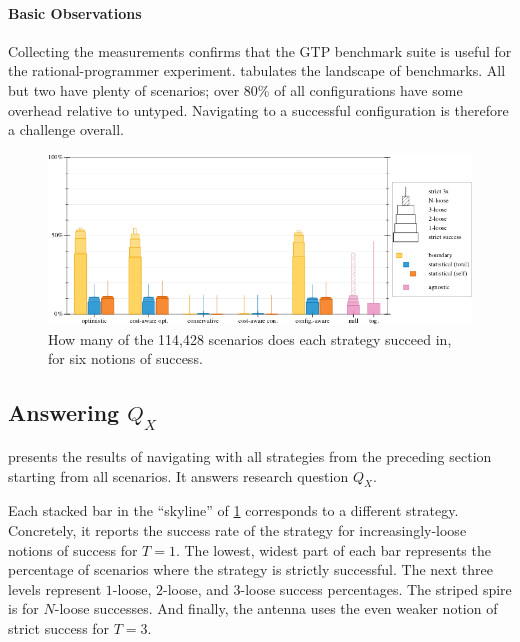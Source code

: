 \paragraph{Basic Observations}

Collecting the measurements confirms that the GTP benchmark suite is useful for
the rational-programmer experiment.  tabulates the
landscape of benchmarks.  All but two have plenty of scenarios; over 80\% of all
configurations have some overhead relative to untyped.  Navigating to a
successful configuration is therefore a challenge overall.

\begin{figure}[ht]
  \includegraphics[width=\columnwidth]{data/strategy-overall-feasible.pdf}
  \caption{How many of the 114,428 scenarios does each strategy succeed in, for six notions of success.}
  \label{f:strategy-overall}
\end{figure}

\subsection{Answering $Q_X$} \label{subsec:qx}

 presents the results of navigating with all strategies
from the preceding section starting from all scenarios. It answers
research question $Q_X$. 

Each stacked bar in the ``skyline'' of \cref{f:strategy-overall} corresponds to
a different strategy. Concretely, it reports the success
rate of the strategy for increasingly-loose notions of success for $T = 1$.  The
lowest, widest part of each bar represents the percentage of scenarios where the
strategy is strictly successful. The next three levels represent $1$-loose,
$2$-loose, and $3$-loose success percentages.  The striped spire is for
$N$-loose successes.  And finally, the antenna uses the even weaker notion of
strict success for $T = 3$.

